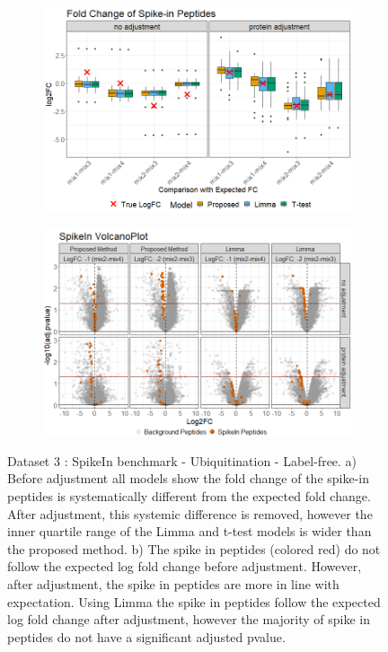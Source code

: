 \documentclass[mcp]{article}
\numberwithin{table}{section}
\begin{document}
\begin{figure}[ht]
\centering
\begin{subfigure}[c]{0.825\linewidth}
\includegraphics[width=1\textwidth]{images/spike_in_fc.png}
\caption{}
\label{fig:spikein_boxplot}
\end{subfigure}
\begin{subfigure}[c]{0.825\linewidth}
\includegraphics[width=1\textwidth]{images/spike_in_volcano.png}
\caption{}
\label{fig:spikein_prop_volcano}
\end{subfigure}
\caption{Dataset 3 : SpikeIn benchmark - Ubiquitination - Label-free. a) Before adjustment all models show the fold change of the spike-in peptides is systematically different from the expected fold change. After adjustment, this systemic difference is removed, however the inner quartile range of the Limma and t-test models is wider than the proposed method. b) The spike in peptides (colored red) do not follow the expected log fold change before adjustment. However, after adjustment, the spike in peptides are more in line with expectation. Using Limma the spike in peptides follow the expected log fold change after adjustment, however the majority of spike in peptides do not have a significant adjusted pvalue.}
\label{fig:spikein_volcano}
\end{figure}
\end{document}
